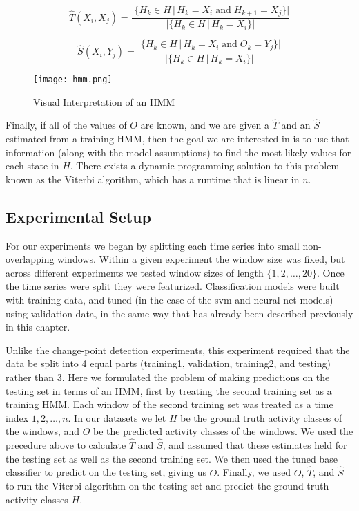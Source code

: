 \[
\hat{T}(X_i,X_j) = \frac{|\{H_k \in H \, | \, H_k=X_i \; \text{and} \; H_{k+1}=X_j\}|} {|\{H_k \in H \, | \, H_k=X_i\}|}
\]

\[
\hat{S}(X_i,Y_j) = \frac{|\{H_k \in H \, | \, H_k=X_i \; \text{and} \; O_k=Y_j\}|} {|\{H_k \in H \, | \, H_k=X_i\}|}
\]

\begin{figure}
 \centering
 \texttt{[image: hmm.png]}
 \caption{Visual Interpretation of an HMM}
 \label{fig:hmm}
\end{figure}

Finally, if all of the values of $O$ are known, and we are given
a $\hat{T}$ and an $\hat{S}$ estimated from a training HMM, then the goal we are interested in
is to use that information (along with the model assumptions)
to find the most likely values for each state in $H$. There
exists a dynamic programming solution to this problem known as the Viterbi
algorithm, which has a runtime that is linear in $n$. \cite{russell10}

\subsection{Experimental Setup}

For our experiments we began by splitting each time series into small non-overlapping windows. Within a
given experiment the window size was fixed, but across different experiments we
tested window sizes of length $\{1,2, \ldots ,20\}$. Once the time series were
split they were featurized. Classification
models were built with training data,
and tuned (in the case of the svm and neural net models) using validation data,
in the same way that has already been described previously in this chapter.

Unlike the change-point detection experiments, this experiment required
that the data be split into 4 equal parts (training1, validation, training2,
and testing) rather than 3. 
Here we formulated the problem of making predictions on the testing set in terms
of an HMM, first by treating the second training set as a training HMM. Each
window of the second training set was treated as a time index ${1,2, \ldots, n}$.
In our datasets we
let $H$ be the ground truth activity classes of the windows, and $O$ be the
predicted activity classes of the windows. We used the precedure above to
calculate $\hat{T}$ and $\hat{S}$, and assumed that these estimates held for
the testing set as well as the second training set. We then used the
tuned base classifier to predict on the testing set, giving us $O$. Finally,
we used $O$, $\hat{T}$, and $\hat{S}$ to run the Viterbi algorithm on the
testing set and predict the ground truth activity classes $H$.
